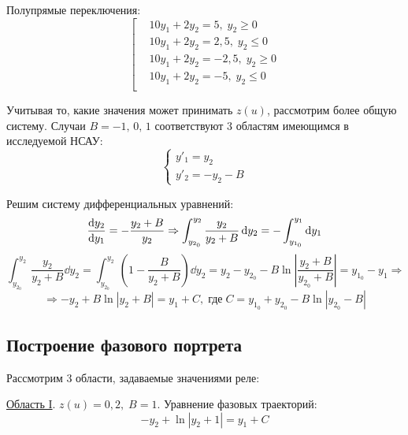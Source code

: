 	Полупрямые переключения:
	\begin{equation*}
		\left[
		\begin{aligned}
			&10y_1 + 2y_2 = 5,\;y_2 \geq 0 \\
			&10y_1 + 2y_2 = 2,5,\;y_2 \leq 0 \\
			&10y_1 + 2y_2 = -2,5,\;y_2 \geq 0 \\
			&10y_1 + 2y_2 = -5,\;y_2 \leq 0 \\
		\end{aligned}\right.
	\end{equation*}

	Учитывая то, какие значения может принимать $z(u)$, рассмотрим более общую систему. Случаи $B=-1,\, 0,\, 1$ соответствуют 3 областям имеющимся в исследуемой НСАУ:
	\begin{equation*}
		\begin{cases}
			y'_1 = y_2 \\
			y'_2 = -y_2 - B
		\end{cases}
	\end{equation*}

	Решим систему дифференциальных уравнений:
	\begin{equation*}
		\dv{y_2}{y_1}= -\frac{y_2+B}{y_2} \Rightarrow \int_{y_{2_0}}^{y_2} \frac{y_2}{y_2+B} \dd{y_2} = -\int_{y_{1_0}}^{y_1} \dd{y_1}
	\end{equation*}
	\begin{equation*}
		\int_{y_{2_0}}^{y_2} \frac{y_2}{y_2+B} \dd{y_2} = \int_{y_{2_0}}^{y_2} \left(1 -\frac{B}{y_2+B}\right) \dd{y_2} = y_2 - y_{2_0} - B\ln{\left|\frac{y_2+B}{y_{2_0}+B}\right|} = y_{1_0} - y_1 \Rightarrow
	\end{equation*}
	\begin{equation*}
		\Rightarrow -y_2 + B\ln{|y_2+B|} = y_1 + C,\;\text{где}\; C= y_{1_0} + y_{2_0} - B\ln{|y_{2_0} - B|}
	\end{equation*}

	\subsection{Построение фазового портрета} 
	
	Рассмотрим 3 области, задаваемые значениями реле:
	
	\underline{Область I}. $z(u) = 0,2,\;B=1$. Уравнение фазовых траекторий:
	\begin{equation*}
		-y_2 + \ln{|y_2+1|} = y_1 + C
	\end{equation*}

